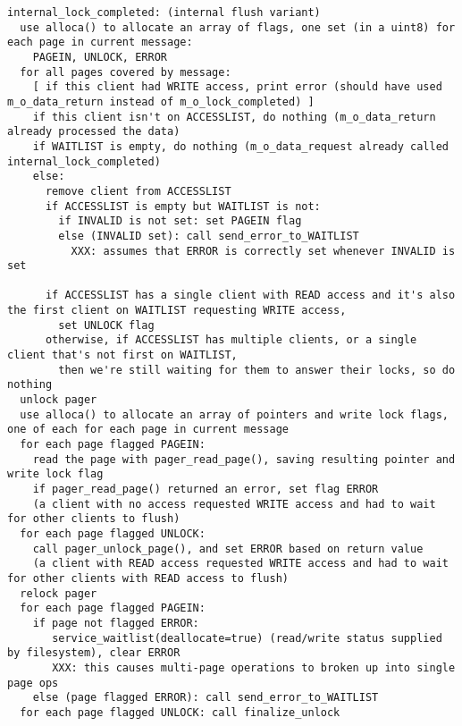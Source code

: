 \documentclass{article}
\begin{document}
\begin{verbatim}
internal_lock_completed: (internal flush variant)
  use alloca() to allocate an array of flags, one set (in a uint8) for each page in current message:
    PAGEIN, UNLOCK, ERROR
  for all pages covered by message:
    [ if this client had WRITE access, print error (should have used m_o_data_return instead of m_o_lock_completed) ]
    if this client isn't on ACCESSLIST, do nothing (m_o_data_return already processed the data)
    if WAITLIST is empty, do nothing (m_o_data_request already called internal_lock_completed)
    else:
      remove client from ACCESSLIST
      if ACCESSLIST is empty but WAITLIST is not:
        if INVALID is not set: set PAGEIN flag
        else (INVALID set): call send_error_to_WAITLIST
          XXX: assumes that ERROR is correctly set whenever INVALID is set

      if ACCESSLIST has a single client with READ access and it's also the first client on WAITLIST requesting WRITE access,
        set UNLOCK flag
      otherwise, if ACCESSLIST has multiple clients, or a single client that's not first on WAITLIST,
        then we're still waiting for them to answer their locks, so do nothing
  unlock pager
  use alloca() to allocate an array of pointers and write lock flags, one of each for each page in current message
  for each page flagged PAGEIN:
    read the page with pager_read_page(), saving resulting pointer and write lock flag
    if pager_read_page() returned an error, set flag ERROR
    (a client with no access requested WRITE access and had to wait for other clients to flush)
  for each page flagged UNLOCK:
    call pager_unlock_page(), and set ERROR based on return value
    (a client with READ access requested WRITE access and had to wait for other clients with READ access to flush)
  relock pager
  for each page flagged PAGEIN:
    if page not flagged ERROR:
       service_waitlist(deallocate=true) (read/write status supplied by filesystem), clear ERROR
       XXX: this causes multi-page operations to broken up into single page ops
    else (page flagged ERROR): call send_error_to_WAITLIST
  for each page flagged UNLOCK: call finalize_unlock
\end{verbatim}
\end{document}
